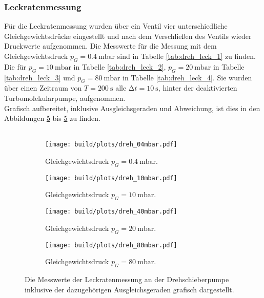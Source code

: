        \subsubsection{Leckratenmessung}

        \noindent Für die Leckratenmessung wurden über ein Ventil vier unterschiedliche Gleichgewichtsdrücke eingestellt
        und nach dem Verschließen des Ventils wieder Druckwerte aufgenommen.
        Die Messwerte für die Messung mit dem Gleichgewichtsdruck $p_G = \SI{0.4}{\milli\bar}$ sind in Tabelle \ref{tab:dreh_leck_1} zu finden.
        Die für $p_G = \SI{10}{\milli\bar}$ in Tabelle \ref{tab:dreh_leck_2}, $p_G = \SI{20}{\milli\bar}$ in Tabelle \ref{tab:dreh_leck_3} 
        und $p_G = \SI{80}{\milli\bar}$ in Tabelle \ref{tab:dreh_leck_4}.
        Sie wurden über einen Zeitraum von $ T = \SI{200}{\second}$ alle $ \increment t = \SI{10}{\second}$, hinter der deaktivierten Turbomolekularpumpe, aufgenommen.\\
        Grafisch aufbereitet, inklusive Ausgleichsgeraden und Abweichung, ist dies in den Abbildungen \ref{img:1} bis  \ref{img:1} zu finden.\\\\
        \begin{figure}[H]
            \begin{subfigure}{0.46\textwidth}
                    \centering
                    \texttt{[image: build/plots/dreh\_04mbar.pdf]}
                    \caption{Gleichgewichtsdruck $p_G = \SI{0.4}{\milli\bar}$.}
                    \label{img:dreh_leck_1}
            \end{subfigure}
            \hfill
            \begin{subfigure}{0.46\textwidth}
                    \centering
                    \texttt{[image: build/plots/dreh\_10mbar.pdf]}
                    \caption{Gleichgewichtsdruck $p_G = \SI{10}{\milli\bar}$.}
                    \label{img:dreh_leck_2}
            \end{subfigure}
            \hfill
            \begin{subfigure}{0.46\textwidth}
              \centering
              \texttt{[image: build/plots/dreh\_40mbar.pdf]}
              \caption{Gleichgewichtsdruck $p_G = \SI{20}{\milli\bar}$.}
              \label{img:dreh_leck_3}
            \end{subfigure}
            \hfill
            \begin{subfigure}{0.46\textwidth}
              \centering
              \texttt{[image: build/plots/dreh\_80mbar.pdf]}
              \caption{Gleichgewichtsdruck $p_G = \SI{80}{\milli\bar}$.}
              \label{img:dreh_leck_4}
            \end{subfigure}
            \caption{Die Messwerte der Leckratenmessung an der Drehschieberpumpe inklusive der dazugehörigen Ausgleichsgeraden grafisch dargestellt.}
            \label{img:1}
        \end{figure}

